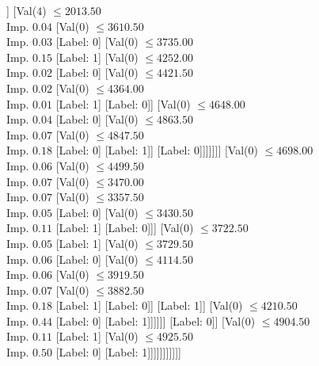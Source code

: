 \documentclass[margin=10pt]{standalone}
\begin{document}
\begin{forest}
								[Label: 1]]
							[Val($4$) $ \leq 2013.50$ \\ Imp. $0.04$
								[Val($0$) $ \leq 3610.50$ \\ Imp. $0.03$
									[Label: 0]
									[Val($0$) $ \leq 3735.00$ \\ Imp. $0.15$
										[Label: 1]
										[Val($0$) $ \leq 4252.00$ \\ Imp. $0.02$
											[Label: 0]
											[Val($0$) $ \leq 4421.50$ \\ Imp. $0.02$
												[Val($0$) $ \leq 4364.00$ \\ Imp. $0.01$
													[Label: 1]
													[Label: 0]]
												[Val($0$) $ \leq 4648.00$ \\ Imp. $0.04$
													[Label: 0]
													[Val($0$) $ \leq 4863.50$ \\ Imp. $0.07$
														[Val($0$) $ \leq 4847.50$ \\ Imp. $0.18$
															[Label: 0]
															[Label: 1]]
														[Label: 0]]]]]]]
								[Val($0$) $ \leq 4698.00$ \\ Imp. $0.06$
									[Val($0$) $ \leq 4499.50$ \\ Imp. $0.07$
										[Val($0$) $ \leq 3470.00$ \\ Imp. $0.07$
											[Val($0$) $ \leq 3357.50$ \\ Imp. $0.05$
												[Label: 0]
												[Val($0$) $ \leq 3430.50$ \\ Imp. $0.11$
													[Label: 1]
													[Label: 0]]]
											[Val($0$) $ \leq 3722.50$ \\ Imp. $0.05$
												[Label: 1]
												[Val($0$) $ \leq 3729.50$ \\ Imp. $0.06$
													[Label: 0]
													[Val($0$) $ \leq 4114.50$ \\ Imp. $0.06$
														[Val($0$) $ \leq 3919.50$ \\ Imp. $0.07$
															[Val($0$) $ \leq 3882.50$ \\ Imp. $0.18$
																[Label: 1]
																[Label: 0]]
															[Label: 1]]
														[Val($0$) $ \leq 4210.50$ \\ Imp. $0.44$
															[Label: 0]
															[Label: 1]]]]]]
										[Label: 0]]
									[Val($0$) $ \leq 4904.50$ \\ Imp. $0.11$
										[Label: 1]
										[Val($0$) $ \leq 4925.50$ \\ Imp. $0.50$
											[Label: 0]
											[Label: 1]]]]]]]]]]]

\end{forest}
\end{document}
